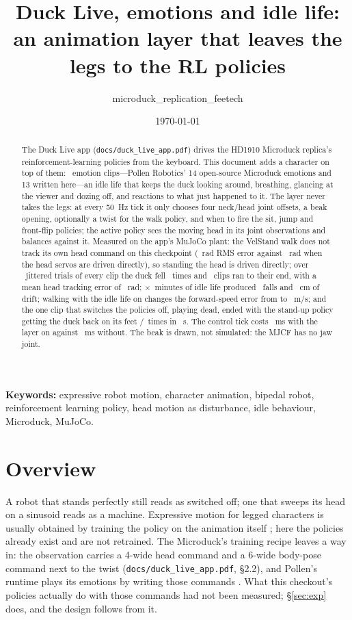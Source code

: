\documentclass[11pt]{article}
\title{Duck Live, emotions and idle life:\\ an animation layer that leaves the legs to the RL policies}
\author{microduck\_replication\_feetech}
\date{\today}
\newcommand{\code}[1]{\texttt{\small #1}}
\begin{document}
\sloppy
\maketitle

\begin{abstract}
The Duck Live app (\code{docs/duck\_live\_app.pdf}) drives the HD1910 Microduck replica's reinforcement-learning
policies from the keyboard. This document adds a character on top of them: \animClips~emotion clips---Pollen
Robotics' 14 open-source Microduck emotions and 13 written here---an idle life that keeps the duck looking around,
breathing, glancing at the viewer and dozing off, and reactions to what just happened to it. The layer never takes
the legs: at every 50~Hz tick it only chooses four neck/head joint offsets, a beak opening, optionally a twist for
the walk policy, and when to fire the sit, jump and front-flip policies; the active policy sees the moving head in
its joint observations and balances against it. Measured on the app's MuJoCo plant: the VelStand walk does not track
its own head command on this checkpoint (\headRmseStandingCmd~rad RMS error against \headRmseStandingDirect~rad
when the head servos are driven directly), so standing the head is driven directly; over \animTrials~jittered trials
of every clip the duck fell \animFalls~times and \animDone~clips ran to their end, with a mean head tracking error
of \animRmseDirect~rad; \idleSeeds$\times$\idleMinutes~minutes of idle life produced \idleFalls~falls and
\idleDrift~cm of drift; walking with the idle life on changes the forward-speed error from \walkBareVx{} to
\walkLiveVx~m/s; and the one clip that switches the policies off, playing dead, ended with the stand-up policy
getting the duck back on its feet \deadUp/\deadN~times in \deadT~s. The control tick costs \costLive~ms with the
layer on against \costBare~ms without. The beak is drawn, not simulated: the MJCF has no jaw joint.
\end{abstract}

\par\smallskip\noindent\textbf{Keywords:} expressive robot motion, character animation, bipedal robot, reinforcement
learning policy, head motion as disturbance, idle behaviour, Microduck, MuJoCo.\par\smallskip

\section{Overview}
A robot that stands perfectly still reads as switched off; one that sweeps its head on a sinusoid reads as a machine.
Expressive motion for legged characters is usually obtained by training the policy on the animation itself
\cite{bdx}; here the policies already exist and are not retrained. The Microduck's training recipe leaves a way in:
the observation carries a 4-wide head command and a 6-wide body-pose command next to the twist
(\code{docs/duck\_live\_app.pdf}, \S2.2), and Pollen's runtime plays its emotions by writing those commands
\cite{emotions,microduck}. What this checkout's policies actually do with those commands had not been measured;
\S\ref{sec:exp} does, and the design follows from it.
\end{document}
